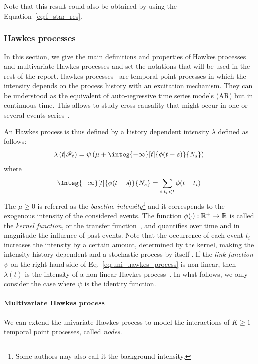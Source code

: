 Note that this result could also be obtained by using the Equation~\eqref{eq:f_star_res}.

\subsubsection{Hawkes processes}\label{hawkes_processes}

In this section, we give the main definitions and properties of Hawkes processes and multivariate Hawkes processes and set the notations that will be used in the rest of the report.
Hawkes processes~\citep{hawkes1971point, hawkes1974cluster} are temporal point processes in which the intensity depends on the process history with an excitation mechanism.
They can be understood as the equivalent of auto-regressive time series models (AR) but in continuous time.
This allows to study cross causality that might occur in one or several events series~\citep{bompaire2019machine}.

An Hawkes process is thus defined by a history dependent intensity $\lambda$ defined as follows:
\begin{equation}\label{eq:uni_hawkes_process}
    \lambda\pars{t\middle| \mathscr{F}_t} = \psi\pars{\mu + \integ{-\infty}[t]{\phi(t-s)}{N_s}}
\end{equation}
where 
\begin{equation}
    \integ{-\infty}[t]{\phi(t-s)}{N_s} = \sum_{i, t_i<t} \phi(t-t_i)
\end{equation}
The $\mu \geq 0$ is referred as the \textit{baseline intensity}\footnote{Some authors may also call it the background intensity.} and it corresponds to the exogenous intensity of the considered events.
The function $\phi(\cdot):\mathbb{R}^+\to\mathbb{R}$ is called the \textit{kernel function}, or the transfer function~\citep{chen2017multivariate}, and quantifies over time and in magnitude the influence of past events.
Note that the occurrence of each event $t_i$ increases the intensity by a certain amount, determined by the kernel, making the intensity history dependent and a stochastic process by itself \citep{de2019temporal}.
If the \textit{link function} $\psi$ on the right-hand side of Eq.~\ref{eq:uni_hawkes_process} is non-linear, then $\lambda(t)$ is the intensity of a non-linear Hawkes process~\citep{bremaud1996stability}.
In what follows, we only consider the case where $\psi$ is the identity function.

\paragraph{Multivariate Hawkes process} We can extend the univariate Hawkes process to model the interactions of $K\geq 1$ temporal point processes, called \textit{nodes}.

